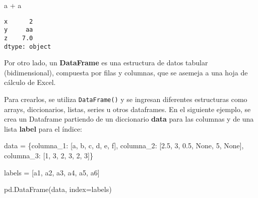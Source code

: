 \documentclass[
  letterpaper,
  DIV=11,
  numbers=noendperiod]{scrreprt}
\newenvironment{Shaded}{\begin{snugshade}}{\end{snugshade}}
\newcommand{\DecValTok}[1]{\textcolor[rgb]{0.68,0.00,0.00}{#1}}
\newcommand{\FloatTok}[1]{\textcolor[rgb]{0.68,0.00,0.00}{#1}}
\newcommand{\NormalTok}[1]{\textcolor[rgb]{0.00,0.23,0.31}{#1}}
\newcommand{\OperatorTok}[1]{\textcolor[rgb]{0.37,0.37,0.37}{#1}}
\newcommand{\StringTok}[1]{\textcolor[rgb]{0.13,0.47,0.30}{#1}}
\newcommand{\VariableTok}[1]{\textcolor[rgb]{0.07,0.07,0.07}{#1}}
\begin{document}
\begin{Shaded}
\begin{Highlighting}[]
\NormalTok{a }\OperatorTok{+}\NormalTok{ a}
\end{Highlighting}
\end{Shaded}

\begin{verbatim}
x      2
y     aa
z    7.0
dtype: object
\end{verbatim}

Por otro lado, un \textbf{DataFrame} es una estructura de datos tabular
(bidimensional), compuesta por filas y columnas, que se asemeja a una
hoja de cálculo de Excel.

Para crearlos, se utiliza \texttt{DataFrame()} y se ingresan diferentes
estructuras como arrays, diccionarios, listas, series u otros
dataframes. En el siguiente ejemplo, se crea un Dataframe partiendo de
un diccionario \textbf{data} para las columnas y de una lista
\textbf{label} para el índice:

\begin{Shaded}
\begin{Highlighting}[]
\NormalTok{data }\OperatorTok{=}\NormalTok{ \{}\StringTok{\textquotesingle{}columna\_1\textquotesingle{}}\NormalTok{: [}\StringTok{\textquotesingle{}a\textquotesingle{}}\NormalTok{, }\StringTok{\textquotesingle{}b\textquotesingle{}}\NormalTok{, }\StringTok{\textquotesingle{}c\textquotesingle{}}\NormalTok{, }\StringTok{\textquotesingle{}d\textquotesingle{}}\NormalTok{, }\StringTok{\textquotesingle{}e\textquotesingle{}}\NormalTok{, }\StringTok{\textquotesingle{}f\textquotesingle{}}\NormalTok{],}
        \StringTok{\textquotesingle{}columna\_2\textquotesingle{}}\NormalTok{: [}\FloatTok{2.5}\NormalTok{, }\DecValTok{3}\NormalTok{, }\FloatTok{0.5}\NormalTok{, }\VariableTok{None}\NormalTok{, }\DecValTok{5}\NormalTok{, }\VariableTok{None}\NormalTok{],}
        \StringTok{\textquotesingle{}columna\_3\textquotesingle{}}\NormalTok{: [}\DecValTok{1}\NormalTok{, }\DecValTok{3}\NormalTok{, }\DecValTok{2}\NormalTok{, }\DecValTok{3}\NormalTok{, }\DecValTok{2}\NormalTok{, }\DecValTok{3}\NormalTok{]\}}

\NormalTok{labels }\OperatorTok{=}\NormalTok{ [}\StringTok{\textquotesingle{}a1\textquotesingle{}}\NormalTok{, }\StringTok{\textquotesingle{}a2\textquotesingle{}}\NormalTok{, }\StringTok{\textquotesingle{}a3\textquotesingle{}}\NormalTok{, }\StringTok{\textquotesingle{}a4\textquotesingle{}}\NormalTok{, }\StringTok{\textquotesingle{}a5\textquotesingle{}}\NormalTok{, }\StringTok{\textquotesingle{}a6\textquotesingle{}}\NormalTok{]}

\NormalTok{pd.DataFrame(data, index}\OperatorTok{=}\NormalTok{labels)}
\end{Highlighting}
\end{Shaded}
\end{document}
